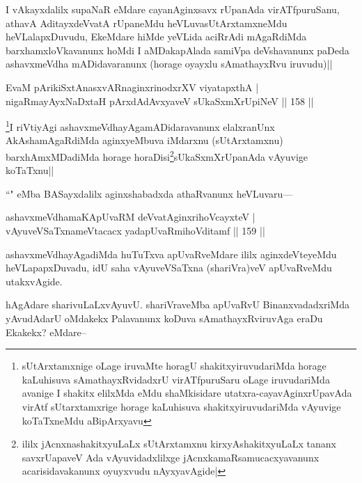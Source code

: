 \begin{artha}
I vAkayxdalilx supaNaR eMdare cayanAginxsavx rUpanAda virATfpuruSanu, athavA AditayxdeVvatA rUpaneMdu heVLuvasUtArxtamxneMdu heVLalapxDuvudu, EkeMdare hiMde yeVLida aciRrAdi mAgaRdiMda barxhamxloVkavanunx hoMdi I aMDakapAlada samiVpa deVshavanunx paDeda ashavxmeVdha mADidavaranunx (horage oyayxlu sAmathayxRvu iruvudu)||
\end{artha}

\begin{shl}
EvaM pArikiSxtAnasxvARnaginxrinodxrXV viyatapxthA |\\
nigaRmayAyxNaDxtaH pArxdAdAvxyaveV sUkaSxmXrUpiNeV \hfill || 158 ||
\end{shl}

\begin{artha}
\footnote{sUtArxtamxnige oLage iruvaMte horagU shakitxyiruvudariMda horage kaLuhisuva sAmathayxRvidadxrU virATfpuruSaru oLage iruvudariMda avanige I shakitx elilxMda eMdu shaMkisidare utatxra-cayavAginxrUpavAda virAtf sUtarxtamxrige horage kaLuhisuva shakitxyiruvudariMda vAyuvige koTaTxneMdu aBipArxyavu}I riVtiyAgi ashavxmeVdhayAgamADidaravanunx elalxranUnx AkAshamAgaRdiMda aginxyeMbuva iMdarxnu (sUtArxtamxnu) barxhAmxMDadiMda horage horaDisi\footnote{ililx jAcnxnashakitxyuLaLx sUtArxtamxnu kirxyAshakitxyuLaLx tananx savxrUapaveV Ada vAyuvidadxlilxge jAcnxkamaRsamucacxyavanunx acarisidavakanunx oyuyxvudu nAyxyavAgide|}sUkaSxmXrUpanAda vAyuvige koTaTxnu||
\end{artha}

\begin{artha}
``\stext" eMba BASayxdalilx aginxshabadxda athaRvanunx heVLuvaru---
\end{artha}

\begin{shl}
ashavxmeVdhamaKApUvaRM deVvatA\s ginxrihoVcayxteV |\\
vAyuveVSaTxnameVtacacx yadapUvaRmihoVditamf \hfill || 159 ||
\end{shl}

\begin{artha}
ashavxmeVdhayAgadiMda huTuTxva apUvaRveMdare ililx aginxdeVteyeMdu heVLapapxDuvadu, idU saha vAyuveVSaTxna (shariVra)veV apUvaRveMdu utakxvAgide.
\end{artha}

\begin{artha}
hAgAdare sharivuLaLxvAyuvU. shariVraveMba apUvaRvU BinanxvadadxriMda yAvudAdarU oMdakekx Palavanunx koDuva sAmathayxRviruvAga eraDu Ekakekx? eMdare--
\end{artha}

